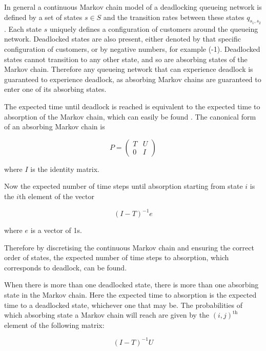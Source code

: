 \documentclass{article}
\numberwithin{equation}{section}
\begin{document}
In general a continuous Markov chain model of a deadlocking queueing network is defined by a set of states $s \in S$ and the transition rates between these states $q_{s_1,s_2}$.
Each state $s$ uniquely defines a configuration of customers around the queueing network.
Deadlocked states are also present, either denoted by that specific configuration of customers, or by negative numbers, for example (-1).
Deadlocked states cannot transition to any other state, and so are absorbing states of the Markov chain.
Therefore any queueing network that can experience deadlock is guaranteed to experience deadlock, as absorbing Markov chains are guaranteed to enter one of its absorbing states.

The expected time until deadlock is reached is equivalent to the expected time to absorption of the Markov chain, which can easily be found \cite{stewart09}.
The canonical form of an absorbing Markov chain is

\begin{equation*}
P = \left(\begin{array}{cc} T & U\\ 0 & I \end{array} \right)
\end{equation*}

where $I$ is the identity matrix.

Now the expected number of time steps until absorption starting from state $i$ is the $i\text{th}$ element of the vector

\begin{equation} \label{eq:abs_probs}
  (I - T)^{-1}e
\end{equation}

where $e$ is a vector of 1s.

Therefore by discretising the continuous Markov chain and ensuring the correct order of states, the expected number of time steps to absorption, which corresponds to deadlock, can be found.

When there is more than one deadlocked state, there is more than one absorbing state in the Markov chain.
Here the expected time to absorption is the expected time to a deadlocked state, whichever one that may be.
The probabilities of which absorbing state a Markov chain will reach are given by the $(i, j)^{\text{th}}$ element of the following matrix:

\begin{equation}
  (I - T)^{-1}U
\end{equation}
\end{document}
